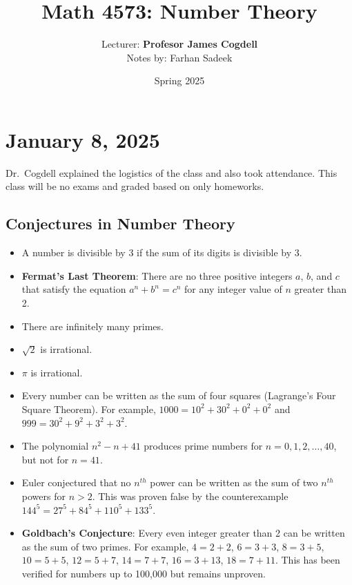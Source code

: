 \documentclass[11pt]{article}
\title{Math 4573: Number Theory}
\author{Lecturer: \textbf{  Profesor James Cogdell}\\Notes by: Farhan Sadeek}
\date{Spring 2025}
\begin{document}
\maketitle

\section{January 8, 2025}

Dr.\ Cogdell explained the logistics of the class and also took attendance.
This class will be no exams and graded based on only homeworks.

\subsection{Conjectures in Number Theory}
\begin{itemize}
    \item A number is divisible by 3 if the sum of its digits is divisible by 3.
    \item \textbf{Fermat's Last Theorem}: There are no three positive integers $a$, $b$, and $c$ that satisfy the equation $a^n + b^n = c^n$ for any integer value of $n$ greater than 2.
    \item There are infinitely many primes.
    \item $\sqrt{2}$ is irrational.
    \item $\pi$ is irrational.
    \item Every number can be written as the sum of four squares (Lagrange's Four Square
          Theorem). For example, $1000 = 10^2 + 30^2 + 0^2 + 0^2$ and $999 = 30^2 + 9^2 +
              3^2 + 3^2$.
    \item The polynomial $n^2 - n + 41$ produces prime numbers for $n = 0, 1, 2, \ldots,
              40$, but not for $n = 41$.
    \item Euler conjectured that no $n^{th}$ power can be written as the sum of two
          $n^{th}$ powers for $n > 2$. This was proven false by the counterexample $144^5
              = 27^5 + 84^5 + 110^5 + 133^5$.
    \item \textbf{Goldbach's Conjecture}: Every even integer greater than 2 can be written as the sum of two primes. For example, $4 = 2 + 2$, $6 = 3 + 3$, $8 = 3 + 5$, $10 = 5 + 5$, $12 = 5 + 7$, $14 = 7 + 7$, $16 = 3 + 13$, $18 = 7 + 11$. This has been verified for numbers up to 100,000 but remains unproven.
\end{itemize}
\end{document}
